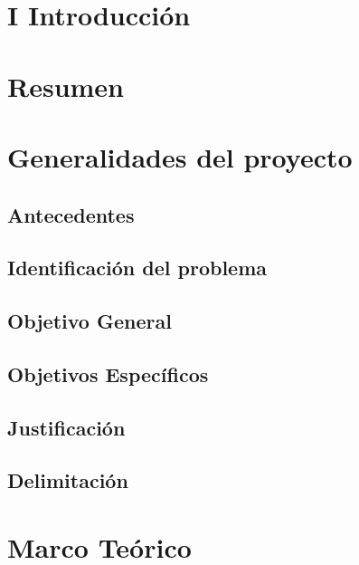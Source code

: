 \documentclass{extbook}
\begin{document}


\tableofcontents
\listoffigures
\listoftables

\chapter{I Introducción}

\chapter{Resumen}

\chapter{Generalidades del proyecto}

    \section{Antecedentes}
      
      
      
    \section{Identificación del problema}
      
    \section{Objetivo General}
      
    \section{Objetivos Específicos}
      
    \section{Justificación}
      
    \section{Delimitación}
    


\chapter{Marco Teórico}
\end{document}
